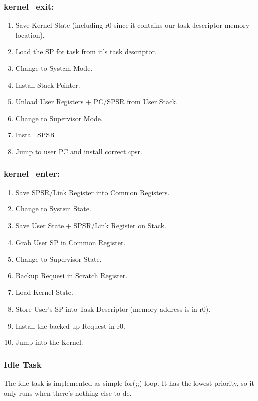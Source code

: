 \documentclass{article}
\begin{document}
\subsubsection{kernel\_exit:}
\begin{enumerate}
    \item Save Kernel State (including r0 since it contains our task descriptor memory location).
    \item Load the SP for task from it's task descriptor.
    \item Change to System Mode. 
    \item Install Stack Pointer.
    \item Unload User Registers + PC/SPSR from User Stack.
    \item Change to Supervisor Mode.
    \item Install SPSR
    \item Jump to user PC and install correct cpsr.
\end{enumerate}

\subsubsection{kernel\_enter:}
\begin{enumerate}
   \item Save SPSR/Link Register into Common Registers.
   \item Change to System State.
   \item Save User State + SPSR/Link Register on Stack.
   \item Grab User SP in Common Register.
   \item Change to Supervisor State.
   \item Backup Request in Scratch Register.
   \item Load Kernel State.
   \item Store User's SP into Task Descriptor (memory address is in r0).
   \item Install the backed up Request in r0.
   \item Jump into the Kernel.
\end{enumerate}

\subsubsection{Idle Task}

The idle task is implemented as simple for(;;) loop. It has the lowest priority, so it only runs when there's nothing else to do.
\end{document}
